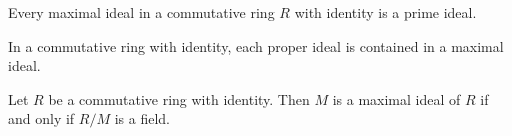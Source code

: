 \begin{theo}
    \label{max_prime_theorem}
    Every maximal ideal in a commutative ring \(R\) with identity is a prime ideal.
\end{theo}

\begin{theo}
    \label{krull_zorn}
    In a commutative ring with identity, each proper ideal is contained in a maximal ideal.
\end{theo}

\begin{theo}
    \label{max_field_theorem}
    Let \(R\) be a commutative ring with identity. Then \(M\) is a maximal ideal of \(R\) if and only if \(R/M\) is a field.
\end{theo}